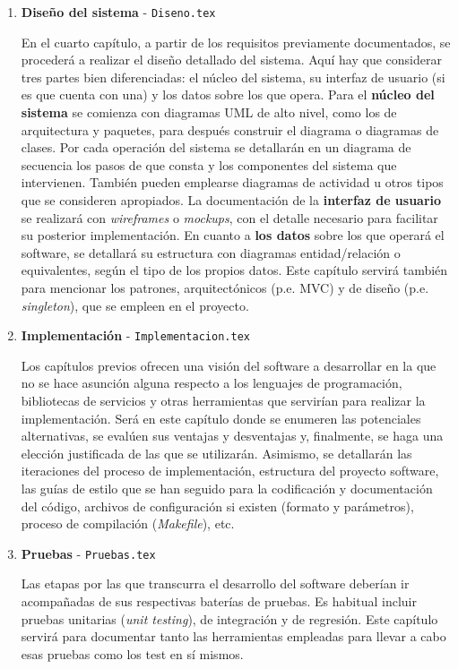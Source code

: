 \begin{enumerate}
	\item \textbf{Diseño del sistema} - \texttt{Diseno.tex} \par
	En el cuarto capítulo, a partir de los requisitos previamente documentados, se procederá a realizar el diseño detallado del sistema. Aquí hay que considerar tres partes bien diferenciadas: el núcleo del sistema, su interfaz de usuario (si es que cuenta con una) y los datos sobre los que opera. Para el \textbf{núcleo del sistema} se comienza con diagramas UML de alto nivel, como los de arquitectura y paquetes, para después construir el diagrama o diagramas de clases. Por cada operación del sistema se detallarán en un diagrama de secuencia los pasos de que consta y los componentes del sistema que intervienen. También pueden emplearse diagramas de actividad u otros tipos que se consideren apropiados. La documentación de la \textbf{interfaz de usuario} se realizará con \textit{wireframes} o \textit{mockups}, con el detalle necesario para facilitar su posterior implementación. En cuanto a \textbf{los datos} sobre los que operará el software, se detallará su estructura con diagramas entidad/relación o equivalentes, según el tipo de los propios datos. Este capítulo servirá también para mencionar los patrones, arquitectónicos (p.e. MVC) y de diseño (p.e. \textit{singleton}), que se empleen en el proyecto.
	
	\item \textbf{Implementación} - \texttt{Implementacion.tex} \par
	Los capítulos previos ofrecen una visión del software a desarrollar en la que no se hace asunción alguna respecto a los lenguajes de programación, bibliotecas de servicios y otras herramientas que servirían para realizar la implementación. Será en este capítulo donde se enumeren las potenciales alternativas, se evalúen sus ventajas y desventajas y, finalmente, se haga una elección justificada de las que se utilizarán. Asimismo, se detallarán las iteraciones del proceso de implementación, estructura del proyecto software, las guías de estilo que se han seguido para la codificación y documentación del código, archivos de configuración si existen (formato y parámetros), proceso de compilación (\textit{Makefile}), etc.
	
	\item \textbf{Pruebas} - \texttt{Pruebas.tex} \par
	Las etapas por las que transcurra el desarrollo del software deberían ir acompañadas de sus respectivas baterías de pruebas. Es habitual incluir pruebas unitarias (\textit{unit testing}), de integración y de regresión. Este capítulo servirá para documentar tanto las herramientas empleadas para llevar a cabo esas pruebas como los test en sí mismos.
	

\end{enumerate}
